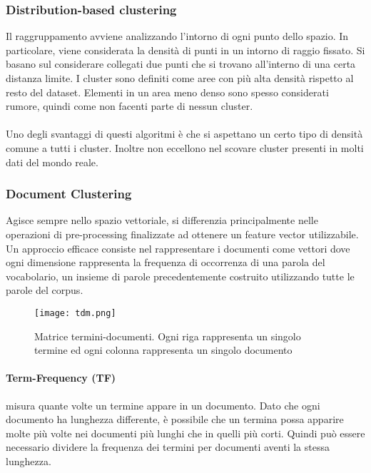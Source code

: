 \subsubsection{Distribution-based clustering}
Il raggruppamento avviene analizzando l'intorno di ogni punto dello spazio. In particolare, viene considerata la densità di punti in un intorno di raggio fissato. Si basano sul considerare collegati due punti che si trovano all’interno di una certa distanza limite.
I cluster sono definiti come aree con più alta densità rispetto al resto del dataset. Elementi in un area meno denso sono spesso considerati rumore, quindi come non facenti parte di nessun cluster.
\\\\
Uno degli svantaggi di questi algoritmi è che si aspettano un certo tipo di densità comune a tutti i cluster. Inoltre non eccellono nel scovare cluster presenti in molti dati del mondo reale.

\subsubsection{Document Clustering}
Agisce sempre nello spazio vettoriale, si differenzia principalmente nelle operazioni di pre-processing finalizzate ad ottenere un feature vector utilizzabile. 
Un approccio efficace consiste nel rappresentare i documenti come vettori dove ogni dimensione rappresenta la frequenza di occorrenza di una parola del vocabolario, un insieme di parole precedentemente costruito utilizzando tutte le parole del corpus. 
\begin{figure}[htb]
	\centering
	\texttt{[image: tdm.png]}
	\caption{Matrice termini-documenti. Ogni riga rappresenta un singolo termine ed ogni colonna rappresenta un singolo documento}
	\label{tdm}
\end{figure}

\paragraph{Term-Frequency (TF)}misura quante volte un termine appare in un documento. Dato che ogni documento ha lunghezza differente, è possibile che un termina possa apparire molte più volte nei documenti più lunghi che in quelli più corti. Quindi può essere necessario  dividere la frequenza dei termini per documenti aventi la stessa lunghezza.

